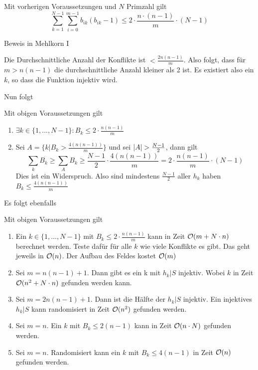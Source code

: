                 \begin{lemma}
                    Mit vorherigen Voraussetzungen und $N$ Primzahl gilt
                    $$
                        \sum_{k=1}^{N-1}{\sum_{i=0}^{m-1}{b_{ik}(b_{ik}-1)}} \leq 2 \cdot \frac{n\cdot (n-1)}{m}\cdot (N-1)
                    $$
                \end{lemma}
                Beweis in Mehlkorn I
                \begin{bemerkung}
                    Die Durchschnittliche Anzahl der Konflikte ist $< \frac{2n(n-1)}{m}$. Also folgt, dass für $m > n(n-1)$ die durchschnittliche Anzahl kleiner als 2 ist. Es existiert also ein $k$, so dass die Funktion injektiv wird.
                \end{bemerkung}
                Nun folgt
                \begin{korollar}
                    Mit obigen Voraussetzungen gilt
                    \begin{enumerate}
                        \item $\exists k \in \{1,...,N-1 \} : B_k \leq 2\cdot \frac{n(n-1)}{m}$
                        \item Sei $A= \{k | B_k > \frac{4(n(n-1))}{m} \}$ und sei $\lvert A\rvert > \frac{N-1}{2}$, dann gilt
                            $$
                                \sum_{k}{B_k} \geq \sum_{A}{B_k} \geq \frac{N-1}{2} \cdot \frac{4(n(n-1))}{m} = 2\cdot \frac{n(n-1)}{m} \cdot (N-1)
                            $$
                            Dies ist ein Widerspruch. Also sind mindestens $\frac{N-1}{2}$ aller $h_k$ haben $B_k \leq \frac{4(n(n-1))}{m}$
                    \end{enumerate}
                \end{korollar}
                Es folgt ebenfalls
                \begin{korollar}
                    Mit obigen Voraussetzungen gilt
                    \begin{enumerate}
                        \item Ein $k \in \{1,...,N-1 \}$ mit $B_k \leq  2\cdot \frac{n(n-1)}{m}$ kann in Zeit $\mathcal{O}(m+N\cdot n)$ berechnet werden. Teste dafür für alle $k$ wie viele Konflikte es gibt. Das geht jeweils in $\mathcal{O}(n)$. Der Aufbau des Feldes kostet $\mathcal{O}(m)$
                        \item Sei $m = n(n-1)+1$. Dann gibt es ein k mit $h_k|S$ injektiv. Wobei $k$ in Zeit $\mathcal{O}(n^2+N\cdot n)$ gefunden werden kann.
                        \item Sei $m= 2n(n-1)+1$. Dann ist die Hälfte der $h_k|S$ injektiv. Ein injektives $h_k|S$ kann randomisiert in Zeit $\mathcal{O}(n^2)$ gefunden werden.
                        \item Sei $m=n$. Ein $k$ mit $B_k \leq 2(n-1)$ kann in Zeit $\mathcal{O}(n\cdot N)$ gefunden werden.
                        \item Sei $m=n$. Randomisiert kann ein $k$ mit $B_k \leq 4(n-1)$ in Zeit $\mathcal{O}(n)$ gefunden werden.
                    \end{enumerate}
                \end{korollar}
                
